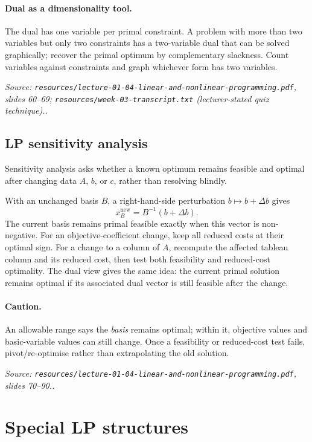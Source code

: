 \documentclass[11pt,a4paper]{article}
\renewcommand{\texttt}[1]{\nolinkurl{#1}}
\newcommand{\source}[1]{\par\smallskip\noindent\textit{Source: #1.}\par\smallskip}
\begin{document}
\paragraph{Dual as a dimensionality tool.} The dual has one variable per primal constraint. A problem with more than two variables but only two constraints has a two-variable dual that can be solved graphically; recover the primal optimum by complementary slackness. Count variables against constraints and graph whichever form has two variables.
\source{\texttt{resources/lecture-01-04-linear-and-nonlinear-programming.pdf}, slides 60--69; \texttt{resources/week-03-transcript.txt} (lecturer-stated quiz technique).}

\subsection{LP sensitivity analysis}
Sensitivity analysis asks whether a known optimum remains feasible and optimal after changing data $A$, $b$, or $c$, rather than resolving blindly.

With an unchanged basis $B$, a right-hand-side perturbation $b\mapsto b+\Delta b$ gives
\[
 x_B^{\mathrm{new}}=B^{-1}(b+\Delta b).
\]
The current basis remains primal feasible exactly when this vector is non-negative. For an objective-coefficient change, keep all reduced costs at their optimal sign. For a change to a column of $A$, recompute the affected tableau column and its reduced cost, then test both feasibility and reduced-cost optimality. The dual view gives the same idea: the current primal solution remains optimal if its associated dual vector is still feasible after the change.

\paragraph{Caution.} An allowable range says the \emph{basis} remains optimal; within it, objective values and basic-variable values can still change. Once a feasibility or reduced-cost test fails, pivot/re-optimise rather than extrapolating the old solution.
\source{\texttt{resources/lecture-01-04-linear-and-nonlinear-programming.pdf}, slides 70--90.}

\section{Special LP structures}
\end{document}
